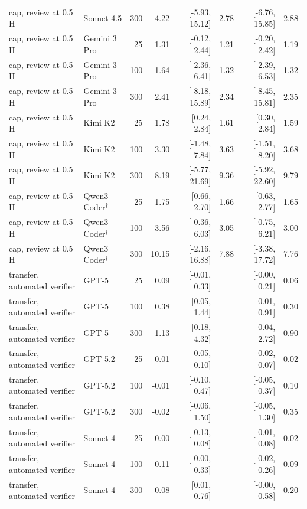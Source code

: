 \begin{table}[t]
\begin{tabular}{llrrrrrr}
cap, review at 0.5 H & Sonnet 4.5 & 300 & 4.22 & [-5.93, 15.12] & 2.78 & [-6.76, 15.85] & 2.88 \\
cap, review at 0.5 H & Gemini 3 Pro & 25 & 1.31 & [-0.12, 2.44] & 1.21 & [-0.20, 2.42] & 1.19 \\
cap, review at 0.5 H & Gemini 3 Pro & 100 & 1.64 & [-2.36, 6.41] & 1.32 & [-2.39, 6.53] & 1.32 \\
cap, review at 0.5 H & Gemini 3 Pro & 300 & 2.41 & [-8.18, 15.89] & 2.34 & [-8.45, 15.81] & 2.35 \\
cap, review at 0.5 H & Kimi K2 & 25 & 1.78 & [0.24, 2.84] & 1.61 & [0.30, 2.84] & 1.59 \\
cap, review at 0.5 H & Kimi K2 & 100 & 3.30 & [-1.48, 7.84] & 3.63 & [-1.51, 8.20] & 3.68 \\
cap, review at 0.5 H & Kimi K2 & 300 & 8.19 & [-5.77, 21.69] & 9.36 & [-5.92, 22.60] & 9.79 \\
cap, review at 0.5 H & Qwen3 Coder$^\dagger$ & 25 & 1.75 & [0.66, 2.70] & 1.66 & [0.63, 2.77] & 1.65 \\
cap, review at 0.5 H & Qwen3 Coder$^\dagger$ & 100 & 3.56 & [-0.36, 6.03] & 3.05 & [-0.75, 6.21] & 3.00 \\
cap, review at 0.5 H & Qwen3 Coder$^\dagger$ & 300 & 10.15 & [-2.16, 16.88] & 7.88 & [-3.38, 17.72] & 7.76 \\
\midrule
transfer, automated verifier & GPT-5 & 25 & 0.09 & [-0.01, 0.33] &  & [-0.00, 0.21] & 0.06 \\
transfer, automated verifier & GPT-5 & 100 & 0.38 & [0.05, 1.44] &  & [0.01, 0.91] & 0.30 \\
transfer, automated verifier & GPT-5 & 300 & 1.13 & [0.18, 4.32] &  & [0.04, 2.72] & 0.90 \\
transfer, automated verifier & GPT-5.2 & 25 & 0.01 & [-0.05, 0.10] &  & [-0.02, 0.07] & 0.02 \\
transfer, automated verifier & GPT-5.2 & 100 & -0.01 & [-0.10, 0.47] &  & [-0.05, 0.37] & 0.10 \\
transfer, automated verifier & GPT-5.2 & 300 & -0.02 & [-0.06, 1.50] &  & [-0.05, 1.30] & 0.35 \\
transfer, automated verifier & Sonnet 4 & 25 & 0.00 & [-0.13, 0.08] &  & [-0.01, 0.08] & 0.02 \\
transfer, automated verifier & Sonnet 4 & 100 & 0.11 & [-0.00, 0.33] &  & [-0.02, 0.26] & 0.09 \\
transfer, automated verifier & Sonnet 4 & 300 & 0.08 & [0.01, 0.76] &  & [-0.00, 0.58] & 0.20 \\

\end{tabular}
\end{table}
